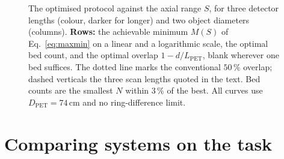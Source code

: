 \documentclass[11pt,a4paper]{article}
\newcommand{\Lpet}{L_{\mathrm{PET}}}
\newcommand{\Dpet}{D_{\mathrm{PET}}}
\begin{document}
\begin{figure}[tbp]
\centering

\caption{The optimised protocol against the axial range $S$, for three detector lengths
(colour, darker for longer) and two object diameters (columns). \textbf{Rows:} the achievable minimum $M(S)$ of
Eq.~\eqref{eq:maxmin} on a linear and a logarithmic scale, the optimal bed count, and the
optimal overlap $1-d/\Lpet$, blank wherever one bed suffices. The dotted line marks the
conventional $50\,\%$ overlap; dashed verticals the three scan lengths quoted in the text.
Bed counts are the smallest $N$ within $3\,\%$ of the best. All curves use
$\Dpet=74\,\mathrm{cm}$ and no ring-difference limit.}
\label{fig:beds}
\end{figure}

\section{Comparing systems on the task}
\label{sec:compare}
\end{document}
